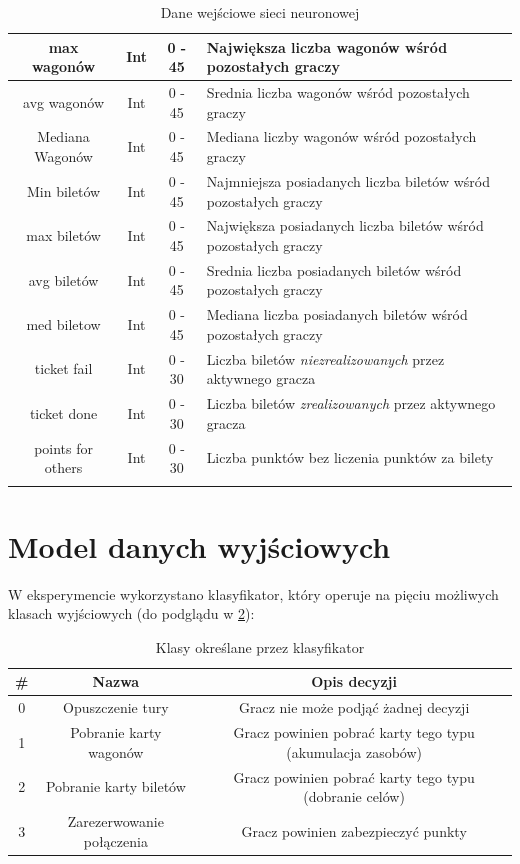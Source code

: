 \documentclass[12pt, oneside]{report}
\begin{document}
\begin{longtable}[h]{| c | c | c | p{6.5cm} |}
	max wagonów  & Int & 0 - 45 & Największa liczba wagonów wśród pozostałych graczy \\ \hline
	avg wagonów  & Int & 0 - 45 & Srednia liczba wagonów wśród pozostałych graczy  \\ \hline
	Mediana Wagonów & Int & 0 - 45 & Mediana liczby wagonów wśród pozostałych graczy  \\ \hline
	Min biletów & Int & 0 - 45 & Najmniejsza posiadanych liczba biletów wśród pozostałych graczy  \\ \hline
	max biletów & Int & 0 - 45 & Największa posiadanych liczba biletów wśród pozostałych graczy  \\ \hline
	avg biletów & Int & 0 - 45 & Srednia liczba posiadanych biletów wśród pozostałych graczy  \\ \hline
	med biletow & Int & 0 - 45 & Mediana liczba posiadanych biletów wśród pozostałych graczy  \\ \hline
	ticket fail & Int & 0 - 30 & Liczba biletów \textit{niezrealizowanych} przez aktywnego gracza \\ \hline
	ticket done & Int & 0 - 30 & Liczba biletów \textit{zrealizowanych} przez aktywnego gracza \\ \hline
	points for others & Int & 0 - 30 & Liczba punktów bez liczenia punktów za bilety \\ \hline
\caption{Dane wejściowe sieci neuronowej}
\label{table:algo_input}
\end{longtable}

\section{Model danych wyjściowych}
W eksperymencie wykorzystano klasyfikator, który operuje na pięciu możliwych klasach wyjściowych (do podglądu w \ref{table:algo_classifcator}):
\begin{table}[h]	
	\begin{center}
		\begin{tabular}{| c | c | c |} \hline
			\# & Nazwa & Opis decyzji \\ \hline
			0 & Opuszczenie tury & Gracz nie może podjąć żadnej decyzji \\ \hline
			1 & Pobranie karty wagonów & Gracz powinien pobrać karty tego typu (akumulacja zasobów) \\ \hline
			2 & Pobranie karty biletów & Gracz powinien pobrać karty tego typu (dobranie celów) \\ \hline
			3 & Zarezerwowanie połączenia & Gracz powinien zabezpieczyć punkty \\ \hline
		\end{tabular}
		\caption{Klasy określane przez klasyfikator}
		\label{table:algo_classifcator}
	\end{center}
\end{table}
\end{document}
